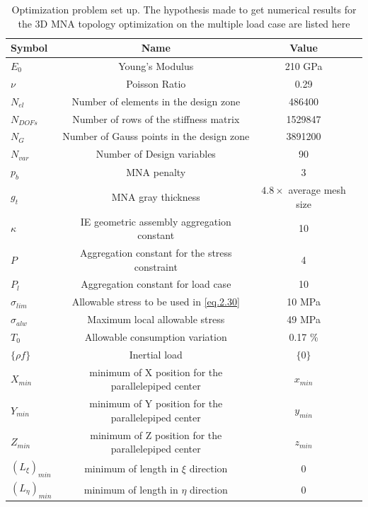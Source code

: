     \begin{table}[h]
            \caption{\label{tab:table3.5} Optimization problem set up. The hypothesis made to get numerical results for the 3D MNA topology optimization on the multiple load case are listed here}
             \centering
             \begin{tabular}{lccc}
             \hline
              Symbol& Name& Value\\\hline
             $E_0$ & Young's Modulus & 210 GPa\\
             $\nu$ & Poisson Ratio& 0.29&\\ $N_{el}$ & Number of elements in the design zone & 486400 \\
             $N_{DOFs}$ & Number of rows of the stiffness matrix & 1529847\\
             $N_G$ & Number of Gauss points in the design zone & 3891200\\
             $N_{var}$ & Number of Design variables & 90\\
    		$p_b$ & MNA penalty & 3\\
    		$g_t$ & MNA gray thickness & $4.8 \times$ average mesh size\\
    		$\kappa$ & IE geometric assembly aggregation constant & 10\\
    		$P$ & Aggregation constant for the stress constraint & 4\\  
    		$P_l$ & Aggregation constant for load case& 10\\ 
    		$\sigma_{lim}$ & Allowable stress to be used in \ref{eq.2.30} & 10 MPa\\
    		$\sigma_{alw}$ & Maximum local allowable stress & 49 MPa\\
    		$T_0$ & Allowable consumption variation & 0.17 \% \\
    		$\lbrace\rho f \rbrace$ & Inertial load & $\lbrace 0 \rbrace$ \\
    		$X_{min}$ & minimum of X position for the parallelepiped center & $x_{min}$\\
    		$Y_{min}$ & minimum of Y position for the parallelepiped center & $y_{min}$\\
    		$Z_{min}$ & minimum of Z position for the parallelepiped center & $z_{min}$\\
    		$(L_\xi)_{min}$ & minimum of length in $\xi$ direction & $0$\\
    		$(L_\eta)_{min}$ & minimum of length in $\eta$ direction & $0$\\

\end{tabular}
\end{table}
